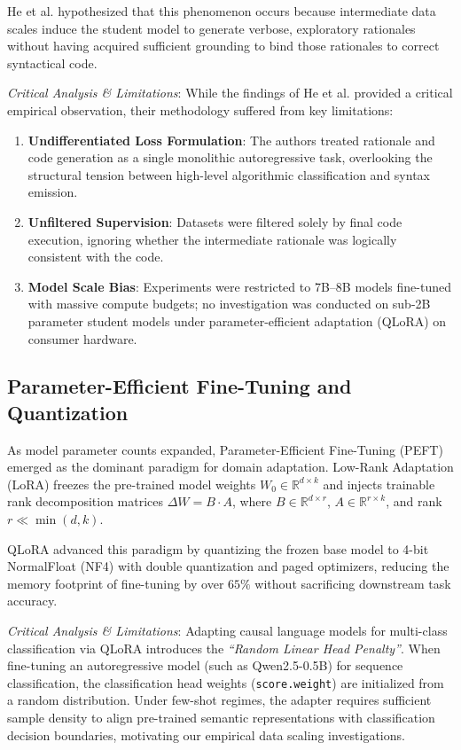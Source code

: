 \documentclass{ieeeaccess}
\begin{document}
He et al. hypothesized that this phenomenon occurs because intermediate data scales induce the student model to generate verbose, exploratory rationales without having acquired sufficient grounding to bind those rationales to correct syntactical code. 

\textit{Critical Analysis \& Limitations}: While the findings of He et al. provided a critical empirical observation, their methodology suffered from key limitations:
\begin{enumerate}
    \item \textbf{Undifferentiated Loss Formulation}: The authors treated rationale and code generation as a single monolithic autoregressive task, overlooking the structural tension between high-level algorithmic classification and syntax emission.
    \item \textbf{Unfiltered Supervision}: Datasets were filtered solely by final code execution, ignoring whether the intermediate rationale was logically consistent with the code.
    \item \textbf{Model Scale Bias}: Experiments were restricted to 7B--8B models fine-tuned with massive compute budgets; no investigation was conducted on sub-2B parameter student models under parameter-efficient adaptation (QLoRA) on consumer hardware.
\end{enumerate}

\subsection{Parameter-Efficient Fine-Tuning and Quantization}
As model parameter counts expanded, Parameter-Efficient Fine-Tuning (PEFT) emerged as the dominant paradigm for domain adaptation. Low-Rank Adaptation (LoRA) \cite{hu2022lora} freezes the pre-trained model weights $W_0 \in \mathbb{R}^{d \times k}$ and injects trainable rank decomposition matrices $\Delta W = B \cdot A$, where $B \in \mathbb{R}^{d \times r}$, $A \in \mathbb{R}^{r \times k}$, and rank $r \ll \min(d, k)$.

QLoRA \cite{dettmers2024qlora} advanced this paradigm by quantizing the frozen base model to 4-bit NormalFloat (NF4) with double quantization and paged optimizers, reducing the memory footprint of fine-tuning by over $65\%$ without sacrificing downstream task accuracy. 

\textit{Critical Analysis \& Limitations}: Adapting causal language models for multi-class classification via QLoRA introduces the \textit{``Random Linear Head Penalty''}. When fine-tuning an autoregressive model (such as Qwen2.5-0.5B) for sequence classification, the classification head weights (\texttt{score.weight}) are initialized from a random distribution. Under few-shot regimes, the adapter requires sufficient sample density to align pre-trained semantic representations with classification decision boundaries, motivating our empirical data scaling investigations.
\end{document}
